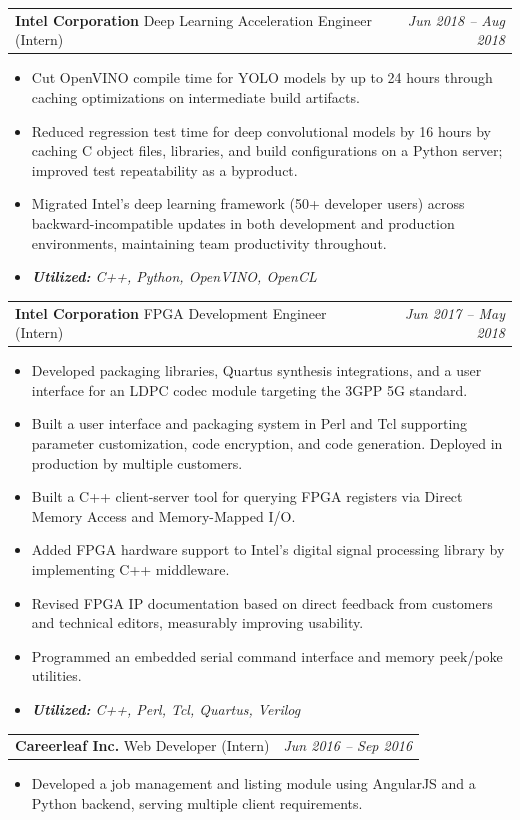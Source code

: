 \documentclass[letterpaper,10pt]{article}
\makeatletter
\newcommand{\resitem}[1]{\item #1 \vspace{0pt}}
\newcommand{\ressubheading}[4]{
\begin{tabular*}{7in}{l@{\extracolsep{\fill}}r}
		\textbf{#1} #2 & \textit{#4} \\
\end{tabular*}\vspace{0pt}}
\makeatother
\begin{document}
        \ressubheading{Intel Corporation}{Deep Learning Acceleration Engineer (Intern)}{}{Jun 2018 -- Aug 2018}
	\begin{itemize} \vspace{-\topsep}
    \setlength{\parskip}{0pt}
    \setlength{\itemsep}{0pt plus 1pt}
        \resitem{Cut OpenVINO compile time for YOLO models by up to 24 hours through caching optimizations on intermediate build artifacts.}
    \resitem{Reduced regression test time for deep convolutional models by 16 hours by caching C object files, libraries, and build configurations on a Python server; improved test repeatability as a byproduct.}
    \resitem{Migrated Intel's deep learning framework (50+ developer users) across backward-incompatible updates in both development and production environments, maintaining team productivity throughout.}
    \resitem{\textsl{\textbf{Utilized:} C++, Python, OpenVINO, OpenCL}}
	\end{itemize}


    \ressubheading{Intel Corporation}{FPGA Development Engineer (Intern)}{}{Jun 2017 -- May 2018}
	\begin{itemize} \vspace{-\topsep}
    \setlength{\parskip}{0pt}
    \setlength{\itemsep}{0pt plus 1pt}
	\resitem{Developed packaging libraries, Quartus synthesis integrations, and a user interface for an LDPC codec module targeting the 3GPP 5G standard.}
    \resitem{Built a user interface and packaging system in Perl and Tcl supporting parameter customization, code encryption, and code generation. Deployed in production by multiple customers.}
    \resitem{Built a C++ client-server tool for querying FPGA registers via Direct Memory Access and Memory-Mapped I/O.}
	\resitem{Added FPGA hardware support to Intel's digital signal processing library by implementing C++ middleware.}
	\resitem{Revised FPGA IP documentation based on direct feedback from customers and technical editors, measurably improving usability.}
	\resitem{Programmed an embedded serial command interface and memory peek/poke utilities.}
    \resitem{\textsl{\textbf{Utilized:} C++, Perl, Tcl, Quartus, Verilog}}
	\end{itemize}

    \ressubheading{Careerleaf Inc.}{Web Developer (Intern)}{}{Jun 2016 -- Sep 2016}
	\begin{itemize} \vspace{-\topsep}
    \setlength{\parskip}{0pt}
    \setlength{\itemsep}{0pt plus 1pt}
	\resitem{Developed a job management and listing module using AngularJS and a Python backend, serving multiple client requirements.}
	\end{itemize}
\end{document}
